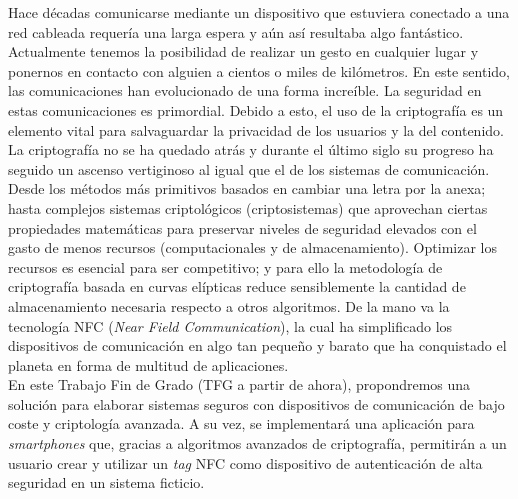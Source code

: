 \documentclass[../PFC.tex]{subfiles}
\begin{document}
Hace décadas comunicarse mediante un dispositivo que estuviera conectado a una red cableada requería una larga espera y aún así resultaba algo fantástico. Actualmente tenemos la posibilidad de realizar un gesto en cualquier lugar y ponernos en contacto con alguien a cientos o miles de kilómetros. En este sentido, las comunicaciones han evolucionado de una forma increíble. La seguridad en estas comunicaciones es primordial. Debido a esto, el uso de la criptografía es un elemento vital para salvaguardar la privacidad de los usuarios y la del contenido.
\*
\vspace{0.5515cm}
\\
La criptografía no se ha quedado atrás y durante el último siglo su progreso ha seguido un ascenso vertiginoso al igual que el de los sistemas de comunicación. Desde los métodos más primitivos basados en cambiar una letra por la anexa; hasta complejos sistemas criptológicos (criptosistemas) que aprovechan ciertas propiedades matemáticas para preservar niveles de seguridad elevados con el gasto de menos recursos (computacionales y de almacenamiento). Optimizar los recursos es esencial para ser competitivo; y para ello la metodología de criptografía basada en curvas elípticas reduce sensiblemente la cantidad de almacenamiento necesaria respecto a otros algoritmos. De la mano va la tecnología NFC (\textit{Near Field Communication}), la cual ha simplificado los dispositivos de comunicación en algo tan pequeño y barato que ha conquistado el planeta en forma de multitud de aplicaciones.
\*
\vspace{0.5515cm}
\\
En este Trabajo Fin de Grado (TFG a partir de ahora), propondremos una solución para elaborar sistemas seguros con dispositivos de comunicación de bajo coste y criptología avanzada. A su vez, se implementará una aplicación para \textit{smartphones} que, gracias a algoritmos avanzados de criptografía, permitirán a un usuario crear y utilizar un \textit{tag} NFC como dispositivo de autenticación de alta seguridad en un sistema ficticio.
\*
\vspace{0.5515cm}
\\
\end{document}
